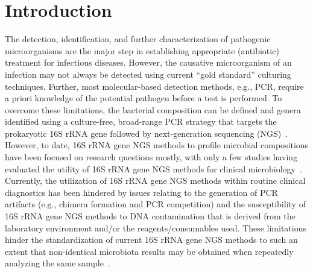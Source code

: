 \section*{Introduction}
The detection, identification, and further characterization of pathogenic microorganisms are the major step in establishing
appropriate (antibiotic) treatment for infectious diseases. However, the causative microorganism of an infection may not
always be detected using current “gold standard” culturing techniques. Further, most molecular-based detection methods,
e.g., PCR, require a priori knowledge of the potential pathogen before a test is performed. To overcome these limitations,
the bacterial composition can be defined and genera identified using a culture-free, broad-range PCR strategy that targets
the prokaryotic 16S rRNA gene followed by next-generation sequencing (NGS)~\cite{fournier2011prospects}. However, to date,
16S rRNA gene NGS methods to profile microbial compositions have been focused on research questions mostly, with only a few
studies having evaluated the utility of 16S rRNA gene NGS methods for clinical microbiology~\cite{rhoads2012comparison,salipante2013rapid}.
Currently, the utilization of 16S rRNA gene NGS methods within routine clinical diagnostics has been hindered by issues
relating to the generation of PCR artifacts (e.g., chimera formation and PCR competition) and the susceptibility of 16S rRNA
gene NGS methods to DNA contamination that is derived from the laboratory environment and/or the reagents/consumables used.
These limitations hinder the standardization of current 16S rRNA gene NGS methods to such an extent that non-identical
microbiota results may be obtained when repeatedly analyzing the same sample~\cite{hiergeist2016multicenter}.

